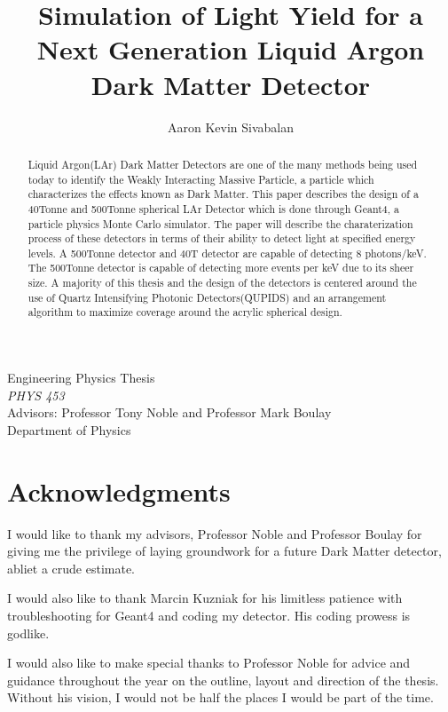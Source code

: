 \documentclass[11pt,a4paper,oneside]{report}
\title{Simulation of Light Yield for a Next Generation Liquid Argon Dark Matter Detector}
\author{Aaron Kevin Sivabalan}
\begin{document}
\begin{minipage}[h]{\textwidth}
    \maketitle
\thispagestyle{empty}
\begin{center}
Engineering Physics Thesis\\
\emph {PHYS 453} \\
Advisors: Professor Tony Noble and Professor Mark Boulay\\
Department of Physics
\end{center}
\begin{abstract}

Liquid Argon(LAr) Dark Matter Detectors are one of the many methods being used today to identify the Weakly Interacting Massive Particle, a particle which characterizes the effects known as Dark Matter. This paper describes the design of a 40Tonne and 500Tonne spherical LAr Detector which is done through Geant4, a particle physics Monte Carlo simulator. The paper will describe the charaterization process of these detectors in terms of their ability to detect light at specified energy levels. A 500Tonne detector and 40T detector are capable of detecting 8 photons/keV. The 500Tonne detector is capable of detecting more events per keV due to its sheer size. A majority of this thesis and the design of the detectors is centered around the use of Quartz Intensifying Photonic Detectors(QUPIDS) and an arrangement algorithm to maximize coverage around the acrylic spherical design.  

\end{abstract}
\end{minipage}


\newpage
\chapter*{Acknowledgments}

I would like to thank my advisors, Professor Noble and Professor Boulay for giving me the privilege of laying groundwork for a future Dark Matter detector, abliet a crude estimate. 

I would also like to thank Marcin Kuzniak for his limitless patience with troubleshooting for Geant4 and coding my detector. His coding prowess is godlike.

I would also like to make special thanks to Professor Noble for advice and guidance throughout the year on the outline, layout and direction of the thesis. Without his vision, I would not be half the places I would be part of the time.
\end{document}
